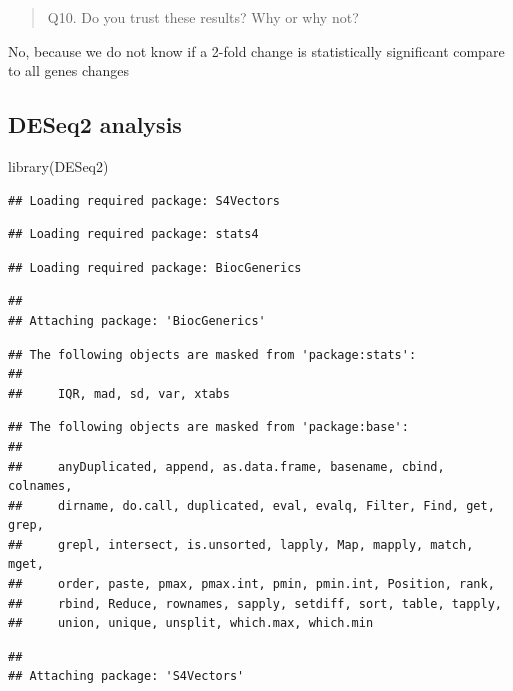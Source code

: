 \documentclass[
]{article}
\newenvironment{Shaded}{\begin{snugshade}}{\end{snugshade}}
\newcommand{\FunctionTok}[1]{\textcolor[rgb]{0.00,0.00,0.00}{#1}}
\newcommand{\NormalTok}[1]{#1}
\begin{document}
\begin{quote}
Q10. Do you trust these results? Why or why not?
\end{quote}

No, because we do not know if a 2-fold change is statistically
significant compare to all genes changes

\hypertarget{deseq2-analysis}{%
\subsection{DESeq2 analysis}\label{deseq2-analysis}}

\begin{Shaded}
\begin{Highlighting}[]
\FunctionTok{library}\NormalTok{(DESeq2)}
\end{Highlighting}
\end{Shaded}

\begin{verbatim}
## Loading required package: S4Vectors
\end{verbatim}

\begin{verbatim}
## Loading required package: stats4
\end{verbatim}

\begin{verbatim}
## Loading required package: BiocGenerics
\end{verbatim}

\begin{verbatim}
## 
## Attaching package: 'BiocGenerics'
\end{verbatim}

\begin{verbatim}
## The following objects are masked from 'package:stats':
## 
##     IQR, mad, sd, var, xtabs
\end{verbatim}

\begin{verbatim}
## The following objects are masked from 'package:base':
## 
##     anyDuplicated, append, as.data.frame, basename, cbind, colnames,
##     dirname, do.call, duplicated, eval, evalq, Filter, Find, get, grep,
##     grepl, intersect, is.unsorted, lapply, Map, mapply, match, mget,
##     order, paste, pmax, pmax.int, pmin, pmin.int, Position, rank,
##     rbind, Reduce, rownames, sapply, setdiff, sort, table, tapply,
##     union, unique, unsplit, which.max, which.min
\end{verbatim}

\begin{verbatim}
## 
## Attaching package: 'S4Vectors'
\end{verbatim}
\end{document}
